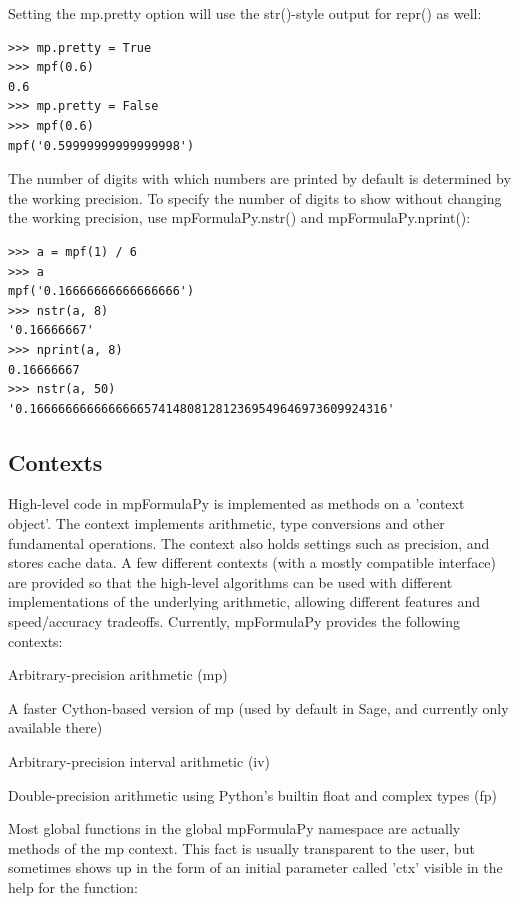 Setting the mp.pretty option will use the str()-style output for repr() as well:

\begin{lstlisting}
>>> mp.pretty = True
>>> mpf(0.6)
0.6
>>> mp.pretty = False
>>> mpf(0.6)
mpf('0.59999999999999998')
\end{lstlisting}


The number of digits with which numbers are printed by default is determined by the working precision. To specify the number of digits to show without changing the working precision, use mpFormulaPy.nstr() and mpFormulaPy.nprint():

\begin{lstlisting}
>>> a = mpf(1) / 6
>>> a
mpf('0.16666666666666666')
>>> nstr(a, 8)
'0.16666667'
>>> nprint(a, 8)
0.16666667
>>> nstr(a, 50)
'0.16666666666666665741480812812369549646973609924316'
\end{lstlisting}














\subsection{Contexts}  

High-level code in mpFormulaPy is implemented as methods on a 'context object'. The context implements arithmetic, type conversions and other fundamental operations. The context also holds settings such as precision, and stores cache data. A few different contexts (with a
mostly compatible interface) are provided so that the high-level algorithms can be used with different implementations of the underlying arithmetic, allowing different features and speed/accuracy tradeoffs. Currently, mpFormulaPy provides the following contexts:

\vpara
Arbitrary-precision arithmetic (mp)

A faster Cython-based version of mp (used by default in Sage, and currently only available there)

Arbitrary-precision interval arithmetic (iv)

Double-precision arithmetic using Python's builtin float and complex types (fp)

\vpara
Most global functions in the global mpFormulaPy namespace are actually methods of the mp context. This fact is usually transparent to the user, but sometimes shows up in the form of an initial parameter called 'ctx' visible in the help for the function:

